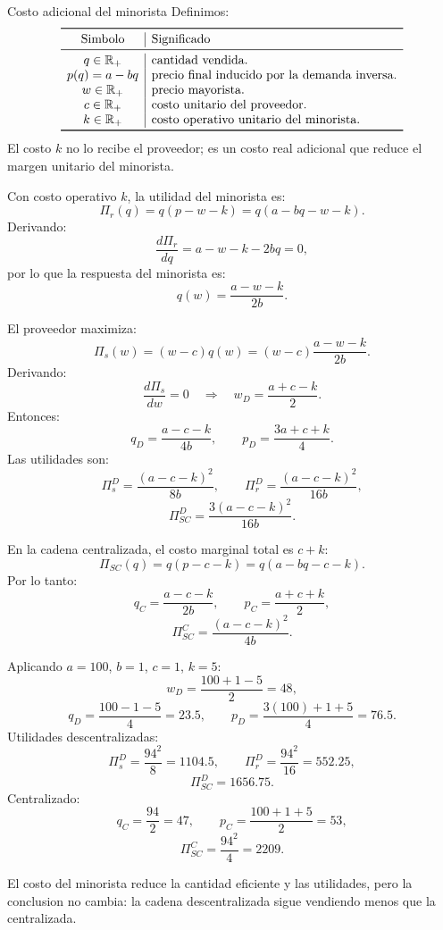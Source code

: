 \begin{solucion}{Costo adicional del minorista}
Definimos:
\[
\begin{array}{c|l}
\toprule
\text{Simbolo} & \text{Significado} \\
\midrule
q\in\mathbb{R}_+ & \text{cantidad vendida.}\\
p(q)=a-bq & \text{precio final inducido por la demanda inversa.}\\
w\in\mathbb{R}_+ & \text{precio mayorista.}\\
c\in\mathbb{R}_+ & \text{costo unitario del proveedor.}\\
k\in\mathbb{R}_+ & \text{costo operativo unitario del minorista.}\\
\bottomrule
\end{array}
\]
El costo \(k\) no lo recibe el proveedor; es un costo real adicional que reduce el margen unitario del minorista.

Con costo operativo \(k\), la utilidad del minorista es:
\[
\Pi_r(q)=q(p-w-k)
=q(a-bq-w-k).
\]
Derivando:
\[
\frac{d\Pi_r}{dq}=a-w-k-2bq=0,
\]
por lo que la respuesta del minorista es:
\[
q(w)=\frac{a-w-k}{2b}.
\]

El proveedor maximiza:
\[
\Pi_s(w)=(w-c)q(w)
=(w-c)\frac{a-w-k}{2b}.
\]
Derivando:
\[
\frac{d\Pi_s}{dw}=0
\quad\Rightarrow\quad
w_D=\frac{a+c-k}{2}.
\]
Entonces:
\[
q_D=\frac{a-c-k}{4b},
\qquad
p_D=\frac{3a+c+k}{4}.
\]
Las utilidades son:
\[
\Pi_s^D=\frac{(a-c-k)^2}{8b},
\qquad
\Pi_r^D=\frac{(a-c-k)^2}{16b},
\]
\[
\Pi_{SC}^D=\frac{3(a-c-k)^2}{16b}.
\]

En la cadena centralizada, el costo marginal total es \(c+k\):
\[
\Pi_{SC}(q)=q(p-c-k)=q(a-bq-c-k).
\]
Por lo tanto:
\[
q_C=\frac{a-c-k}{2b},
\qquad
p_C=\frac{a+c+k}{2},
\]
\[
\Pi_{SC}^C=\frac{(a-c-k)^2}{4b}.
\]

Aplicando \(a=100\), \(b=1\), \(c=1\), \(k=5\):
\[
w_D=\frac{100+1-5}{2}=48,
\]
\[
q_D=\frac{100-1-5}{4}=23.5,
\qquad
p_D=\frac{3(100)+1+5}{4}=76.5.
\]
Utilidades descentralizadas:
\[
\Pi_s^D=\frac{94^2}{8}=1104.5,
\qquad
\Pi_r^D=\frac{94^2}{16}=552.25,
\]
\[
\Pi_{SC}^D=1656.75.
\]
Centralizado:
\[
q_C=\frac{94}{2}=47,
\qquad
p_C=\frac{100+1+5}{2}=53,
\]
\[
\Pi_{SC}^C=\frac{94^2}{4}=2209.
\]

El costo del minorista reduce la cantidad eficiente y las utilidades, pero la conclusion no cambia: la cadena descentralizada sigue vendiendo menos que la centralizada.
\end{solucion}
